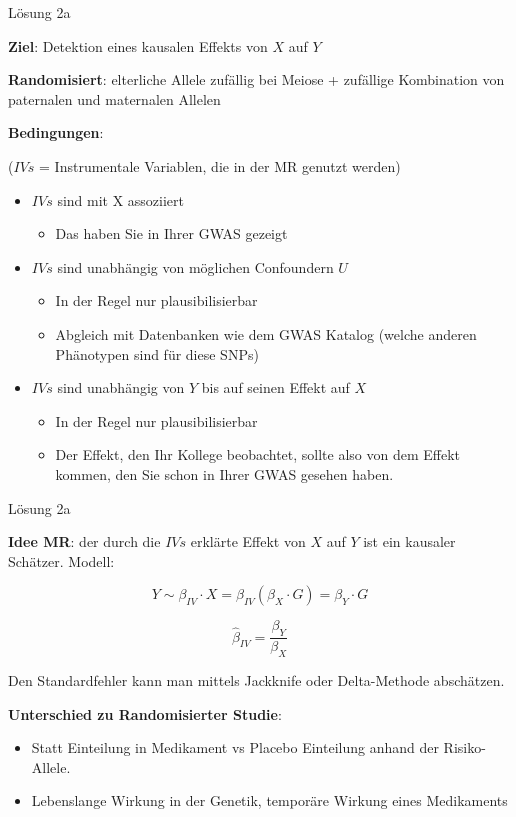 \documentclass{beamer}
\begin{document}
\begin{frame}{Lösung 2a}

\textbf{Ziel}: Detektion eines kausalen Effekts von $X$ auf $Y$

\textbf{Randomisiert}: elterliche Allele zufällig bei Meiose + zufällige Kombination von paternalen und maternalen Allelen

\textbf{Bedingungen}: 

($IVs$ = Instrumentale Variablen, die in der MR genutzt werden)

\begin{itemize}
    \item $IVs$ sind mit X assoziiert 
    \begin{itemize}
        \item Das haben Sie in Ihrer GWAS gezeigt
    \end{itemize}
    \item $IVs$ sind unabhängig von möglichen Confoundern $U$
    \begin{itemize}
        \item In der Regel nur plausibilisierbar
        \item Abgleich mit Datenbanken wie dem GWAS Katalog (welche anderen Phänotypen sind für diese SNPs)
    \end{itemize}
    \item $IVs$ sind unabhängig von $Y$ bis auf seinen Effekt auf $X$
        \begin{itemize}
        \item In der Regel nur plausibilisierbar
        \item Der Effekt, den Ihr Kollege beobachtet, sollte also von dem Effekt kommen, den Sie schon in Ihrer GWAS gesehen haben.
    \end{itemize}
\end{itemize}

\end{frame}

\begin{frame}{Lösung 2a}

\textbf{Idee MR}: der durch die $IVs$ erklärte Effekt von $X$ auf $Y$ ist ein kausaler Schätzer. Modell: 

$$Y \sim \beta_{IV} \cdot X = \beta_{IV}(\beta_X \cdot G) = \beta_Y \cdot G$$

$$ \hat{\beta}_{IV} = \frac{\beta_Y}{\beta_X}$$

Den Standardfehler kann man mittels Jackknife oder Delta-Methode abschätzen. 

\textbf{Unterschied zu Randomisierter Studie}: 

\begin{itemize}
    \item Statt Einteilung in Medikament vs Placebo Einteilung anhand der Risiko-Allele. 
    \item Lebenslange Wirkung in der Genetik, temporäre Wirkung eines Medikaments
\end{itemize}

\end{frame}
\end{document}
